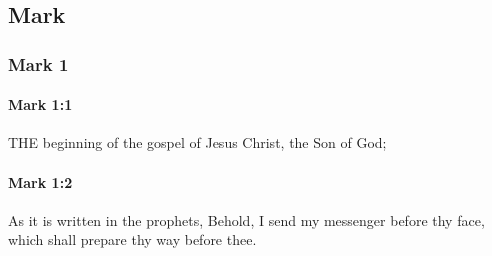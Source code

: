 \subsection{Mark}
	\label{MARK}

	\subsubsection{Mark 1} %
		\label{MARK-1}
		
		\paragraph{Mark 1:1} %
			\label{MARK-1-1}

			THE beginning of the gospel of Jesus Christ, the Son of God;

			\begin{framed}
			\scriptsize
				\begin{compactdesc}
					\item[SBLG] 
				\end{compactdesc}
			\end{framed}

		\paragraph{Mark 1:2} %
			\label{MARK-1-2}

			As it is written in the prophets, Behold, I send my messenger before thy face, which shall prepare thy way before thee.

